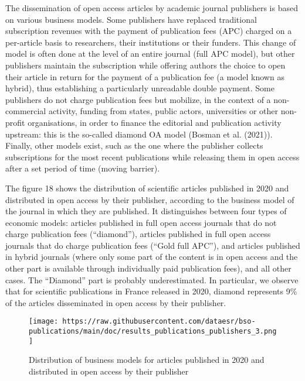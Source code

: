 \documentclass[
]{article}
\begin{document}
The dissemination of open access articles by academic journal publishers
is based on various business models. Some publishers have replaced
traditional subscription revenues with the payment of publication fees
(APC) charged on a per-article basis to researchers, their institutions
or their funders. This change of model is often done at the level of an
entire journal (full APC model), but other publishers maintain the
subscription while offering authors the choice to open their article in
return for the payment of a publication fee (a model known as hybrid),
thus establishing a particularly unreadable double payment. Some
publishers do not charge publication fees but mobilize, in the context
of a non-commercial activity, funding from states, public actors,
universities or other non-profit organisations, in order to finance the
editorial and publication activity upstream: this is the so-called
diamond OA model (Bosman et al. (2021)). Finally, other models exist,
such as the one where the publisher collects subscriptions for the most
recent publications while releasing them in open access after a set
period of time (moving barrier).

The figure 18 shows the distribution of scientific articles published in
2020 and distributed in open access by their publisher, according to the
business model of the journal in which they are published. It
distinguishes between four types of economic models: articles published
in full open access journals that do not charge publication fees
(``diamond''), articles published in full open access journals that do
charge publication fees (``Gold full APC''), and articles published in
hybrid journals (where only some part of the content is in open access
and the other part is available through individually paid publication
fees), and all other cases. The ``Diamond'' part is probably
underestimated. In particular, we observe that for scientific
publications in France released in 2020, diamond represents 9\% of the
articles disseminated in open access by their publisher.

\begin{figure}
\centering
\texttt{[image: https://raw.githubusercontent.com/dataesr/bso-publications/main/doc/results\_publications\_publishers\_3.png]}
\caption{Distribution of business models for articles published in 2020
and distributed in open access by their publisher}
\end{figure}
\end{document}
